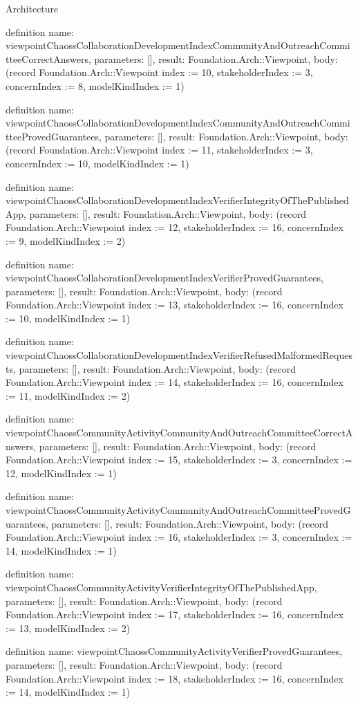\begin{lexlean}{Architecture}
\begin{semanticmodule}
definition{
  name: viewpointChaossCollaborationDevelopmentIndexCommunityAndOutreachCommitteeCorrectAnswers,
  parameters: [],
  result: Foundation.Arch::Viewpoint,
  body: (record Foundation.Arch::Viewpoint {index := 10, stakeholderIndex := 3, concernIndex := 8, modelKindIndex := 1})
}

definition{
  name: viewpointChaossCollaborationDevelopmentIndexCommunityAndOutreachCommitteeProvedGuarantees,
  parameters: [],
  result: Foundation.Arch::Viewpoint,
  body: (record Foundation.Arch::Viewpoint {index := 11, stakeholderIndex := 3, concernIndex := 10, modelKindIndex := 1})
}

definition{
  name: viewpointChaossCollaborationDevelopmentIndexVerifierIntegrityOfThePublishedApp,
  parameters: [],
  result: Foundation.Arch::Viewpoint,
  body: (record Foundation.Arch::Viewpoint {index := 12, stakeholderIndex := 16, concernIndex := 9, modelKindIndex := 2})
}

definition{
  name: viewpointChaossCollaborationDevelopmentIndexVerifierProvedGuarantees,
  parameters: [],
  result: Foundation.Arch::Viewpoint,
  body: (record Foundation.Arch::Viewpoint {index := 13, stakeholderIndex := 16, concernIndex := 10, modelKindIndex := 1})
}

definition{
  name: viewpointChaossCollaborationDevelopmentIndexVerifierRefusedMalformedRequests,
  parameters: [],
  result: Foundation.Arch::Viewpoint,
  body: (record Foundation.Arch::Viewpoint {index := 14, stakeholderIndex := 16, concernIndex := 11, modelKindIndex := 2})
}

definition{
  name: viewpointChaossCommunityActivityCommunityAndOutreachCommitteeCorrectAnswers,
  parameters: [],
  result: Foundation.Arch::Viewpoint,
  body: (record Foundation.Arch::Viewpoint {index := 15, stakeholderIndex := 3, concernIndex := 12, modelKindIndex := 1})
}

definition{
  name: viewpointChaossCommunityActivityCommunityAndOutreachCommitteeProvedGuarantees,
  parameters: [],
  result: Foundation.Arch::Viewpoint,
  body: (record Foundation.Arch::Viewpoint {index := 16, stakeholderIndex := 3, concernIndex := 14, modelKindIndex := 1})
}

definition{
  name: viewpointChaossCommunityActivityVerifierIntegrityOfThePublishedApp,
  parameters: [],
  result: Foundation.Arch::Viewpoint,
  body: (record Foundation.Arch::Viewpoint {index := 17, stakeholderIndex := 16, concernIndex := 13, modelKindIndex := 2})
}

definition{
  name: viewpointChaossCommunityActivityVerifierProvedGuarantees,
  parameters: [],
  result: Foundation.Arch::Viewpoint,
  body: (record Foundation.Arch::Viewpoint {index := 18, stakeholderIndex := 16, concernIndex := 14, modelKindIndex := 1})
}


\end{semanticmodule}
\end{lexlean}
